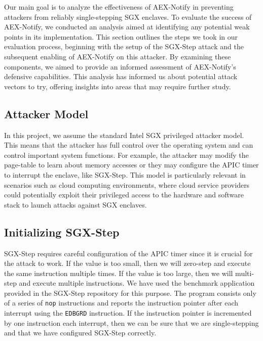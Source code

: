 \documentclass{llncs}
\begin{document}
Our main goal is to analyze the effectiveness of AEX-Notify
in preventing attackers from reliably single-stepping SGX enclaves.
To evaluate the success of AEX-Notify,
we conducted an analysis aimed at identifying any potential weak points in its implementation.
This section outlines the steps we took in our evaluation process,
beginning with the setup of the SGX-Step attack and
the subsequent enabling of AEX-Notify on this attacker.
By examining these components,
we aimed to provide an informed assessment of AEX-Notify’s defensive capabilities.
This analysis has informed us about potential attack vectors to try,
offering insights into areas that may require further study.

\subsection{Attacker Model}

In this project, we assume the standard Intel SGX privileged attacker model.
This means that the attacker has full control over the operating system
and can control important system functions.
For example, the attacker may modify the page-table to learn about memory accesses
or they may configure the APIC timer to interrupt the enclave, like SGX-Step.
This model is particularly relevant in scenarios such as cloud computing
environments, where cloud service providers could potentially exploit their
privileged access to the hardware and software stack to launch attacks against SGX enclaves.

\subsection{Initializing SGX-Step}


SGX-Step requires careful configuration of the APIC timer
since it is crucial for the attack to work.
If the value is too small, then we will zero-step and execute the same instruction multiple times.
If the value is too large, then we will multi-step and execute multiple instructions.
We have used the benchmark application provided in the SGX-Step repository for this purpose.
The program consists only of a series of \texttt{nop} instructions and
reports the instruction pointer after each interrupt using the \texttt{EDBGRD} instruction.
If the instruction pointer is incremented by one instruction each interrupt,
then we can be sure that we are single-stepping and
that we have configured SGX-Step correctly.
\end{document}
